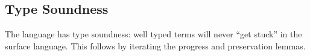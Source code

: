 \subsection{Type Soundness}
 
The language has type soundness: well typed terms will never ``get stuck'' in the surface language.
This follows by iterating the progress and preservation lemmas.
 
 
 
 
 
 
 
 
 
 
 
 
 
